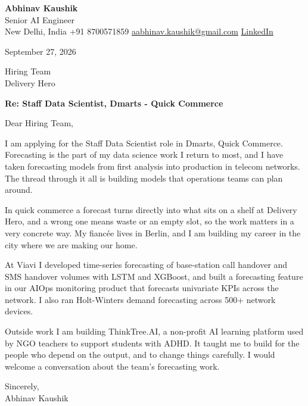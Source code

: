 \documentclass[11pt,a4paper]{article}
\begin{document}
{\Large\bfseries Abhinav Kaushik}\\
Senior AI Engineer\\
New Delhi, India \textbar{} +91 8700571859 \textbar{} \href{mailto:aabhinav.kaushik@gmail.com}{aabhinav.kaushik@gmail.com} \textbar{} \href{https://www.linkedin.com/in/abhinav-kaushik10/}{LinkedIn}  

September 27, 2026

Hiring Team\\
Delivery Hero

\textbf{Re: Staff Data Scientist, Dmarts - Quick Commerce}

Dear Hiring Team,

I am applying for the Staff Data Scientist role in Dmarts, Quick Commerce. Forecasting is the part of my data science work I return to most, and I have taken forecasting models from first analysis into production in telecom networks. The thread through it all is building models that operations teams can plan around.

In quick commerce a forecast turns directly into what sits on a shelf at Delivery Hero, and a wrong one means waste or an empty slot, so the work matters in a very concrete way. My fiancée lives in Berlin, and I am building my career in the city where we are making our home.

At Viavi I developed time-series forecasting of base-station call handover and SMS handover volumes with LSTM and XGBoost, and built a forecasting feature in our AIOps monitoring product that forecasts univariate KPIs across the network. I also ran Holt-Winters demand forecasting across 500+ network devices.

Outside work I am building ThinkTree.AI, a non-profit AI learning platform used by NGO teachers to support students with ADHD. It taught me to build for the people who depend on the output, and to change things carefully. I would welcome a conversation about the team's forecasting work.

Sincerely,\\[4pt]
Abhinav Kaushik
\end{document}

